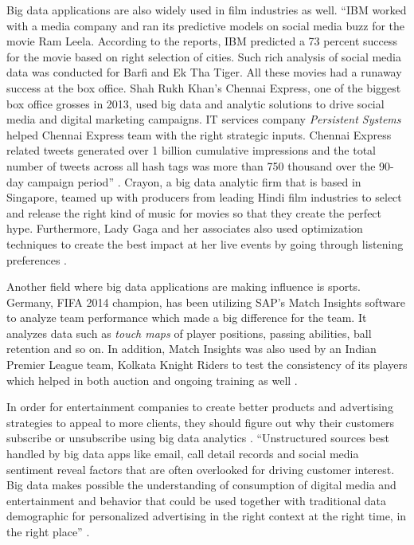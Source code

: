 \documentclass[sigconf]{acmart}
\begin{document}
Big data applications are also widely used in film industries as well. ``IBM worked with a media company and ran its predictive models on social media buzz for the movie Ram Leela. According to the reports, IBM predicted a 73 percent success for the movie based on right selection of cities. Such rich analysis of social media data was conducted for Barfi and Ek Tha Tiger. All these movies had a runaway success at the box office. Shah Rukh Khan's Chennai Express, one of the biggest box office grosses in 2013, used big data and analytic solutions to drive social media and digital marketing campaigns. IT services company {\em Persistent Systems} helped Chennai Express team with the right strategic inputs. Chennai Express related tweets generated over 1 billion cumulative impressions and the total number of tweets across all hash tags was more than 750 thousand over the 90-day campaign period'' \cite{Karania2014industry}. Crayon, a big data analytic firm that is based in Singapore, teamed up with producers from leading Hindi film industries to select and release the right kind of music for movies so that they create the perfect hype. Furthermore, Lady Gaga and her associates also used optimization techniques to create the best impact at her live events by going through listening preferences \cite{Karania2014industry}.

Another field where big data applications are making influence is sports. Germany, FIFA 2014 champion, has been utilizing SAP's Match Insights software to analyze team performance which made a big difference for the team. It analyzes data such as {\em touch maps} of player positions, passing abilities, ball retention and so on. In addition, Match Insights was also used by an Indian Premier League team, Kolkata Knight Riders to test the consistency of its players which helped in both auction and ongoing training as well \cite{Karania2014industry}.

In order for entertainment companies to create better products and advertising strategies to appeal to more clients, they should figure out why their customers subscribe or unsubscribe using big data analytics \cite{Mehta2017entertainment}. ``Unstructured sources best handled by big data apps like email, call detail records and social media sentiment reveal factors that are often overlooked for driving customer interest. Big data makes possible the understanding of consumption of digital media and entertainment and behavior that could be used together with traditional data demographic for personalized advertising in the right context at the right time, in the right place'' \cite{Mehta2017entertainment}.
\end{document}
